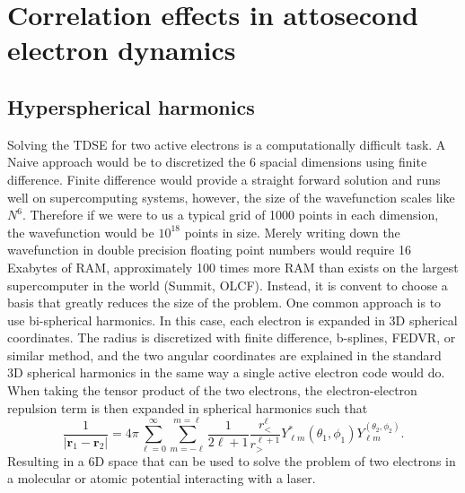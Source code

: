 \chapter{Correlation effects in attosecond electron dynamics} %
\label{cha:electron_correlation}

\section{Hyperspherical harmonics}
\label{sec:hyperspherical}

Solving the TDSE for two active electrons is a computationally difficult task. A Naive approach would be to discretized the 6 spacial dimensions using finite difference. Finite difference would provide a straight forward solution and runs well on supercomputing systems, however, the size of the wavefunction scales like $N^6$. Therefore if we were to us a typical grid of 1000 points in each dimension, the wavefunction would be $10^{18}$ points in size. Merely writing down the wavefunction in double precision floating point numbers would require 16 Exabytes of RAM, approximately 100 times more RAM than exists on the largest supercomputer in the world (Summit, OLCF). Instead, it is convent to choose a basis that greatly reduces the size of the problem. One common approach is to use bi-spherical harmonics. In this case, each electron is expanded in 3D spherical coordinates. The radius is discretized with finite difference, b-splines, FEDVR, or similar method, and the two angular coordinates are explained in the standard 3D spherical harmonics in the same way a single active electron code would do. When taking the tensor product of the two electrons, the electron-electron repulsion term is then expanded in spherical harmonics such that
\begin{equation}
    \frac{1}{|\mathbf{r}_1-\mathbf{r}_2|}= 4\pi \sum_{\ell=0}^\infty \sum_{m=-\ell}^{m=\ell}\frac{1}{2\ell+1}\frac{r_<^\ell}{r_>^{\ell+1}}Y_{\ell m}^*(\theta_1, \phi_1)Y_{\ell m}^(\theta_2, \phi_2).
\end{equation}
Resulting in a 6D space that can be used to solve the problem of two electrons in a molecular or atomic potential interacting with a laser.

